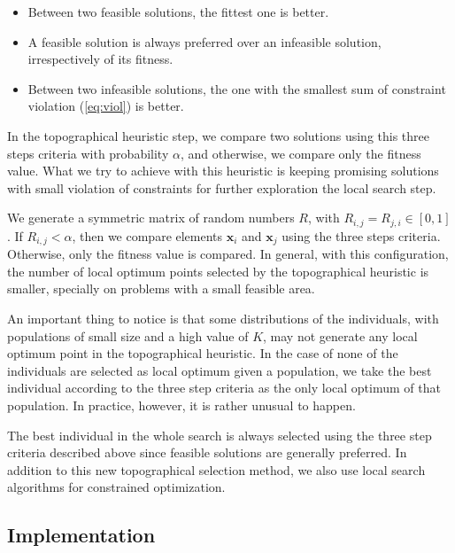 \begin{itemize}

\item Between two feasible solutions, the fittest one is better.

\item A feasible solution is always preferred over an infeasible solution, irrespectively of its fitness.

\item Between two infeasible solutions, the one with the smallest sum of constraint violation (\ref{eq:viol}) is better.

\end{itemize}


In the topographical heuristic step, we compare two solutions using this three steps criteria with probability $\alpha$, and otherwise, we compare only the fitness value. What we try to achieve with this heuristic is keeping promising solutions with small violation of constraints for further exploration the local search step.

We generate a symmetric matrix of random numbers $R$, with $R_{i, j} = R_{j, i} \in [0, 1]$. If $R_{i, j} < \alpha$, then we compare elements $\bm{x}_i$ and $\bm{x}_j$ using the three steps criteria. Otherwise, only the fitness value is compared. In general, with this configuration, the number of local optimum points selected by the topographical heuristic is smaller, specially on problems with a small feasible area. 

An important thing to notice is that some distributions of the individuals, with populations of small size and a high value of $K$, may not generate any local optimum point in the topographical heuristic. In the case of none of the individuals are selected as local optimum given a population, we take the best individual according to the three step criteria as the only local optimum of that population. In practice, however, it is rather unusual to happen.

The best individual in the whole search is always selected using the three step criteria described above since  feasible solutions are generally preferred. In addition to this new topographical selection method, we also use local search algorithms for constrained optimization.


\subsection{Implementation}


